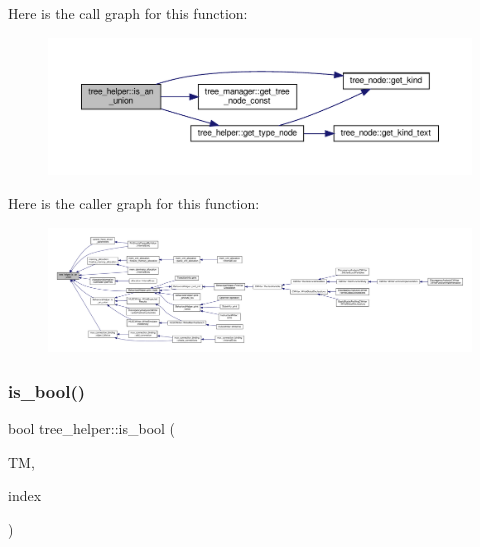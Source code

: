 Here is the call graph for this function\+:
\nopagebreak
\begin{figure}[H]
\begin{center}
\leavevmode
\includegraphics[width=350pt]{d7/d99/classtree__helper_abc58540390ce3475eb640025e1e6ea61_cgraph}
\end{center}
\end{figure}
Here is the caller graph for this function\+:
\nopagebreak
\begin{figure}[H]
\begin{center}
\leavevmode
\includegraphics[width=350pt]{d7/d99/classtree__helper_abc58540390ce3475eb640025e1e6ea61_icgraph}
\end{center}
\end{figure}
\mbox{\label{classtree__helper_a23c2062c16635d268a1dc97e50928e47}} 
\subsubsection{\texorpdfstring{is\+\_\+bool()}{is\_bool()}}
{\footnotesize\ttfamily bool tree\+\_\+helper\+::is\+\_\+bool (\begin{DoxyParamCaption}\item[{const \hyperlink{tree__manager_8hpp_a792e3f1f892d7d997a8d8a4a12e39346}{tree\+\_\+manager\+Const\+Ref} \&}]{TM,  }\item[{const unsigned int}]{index }\end{DoxyParamCaption})\hspace{0.3cm}{\ttfamily [static]}}



